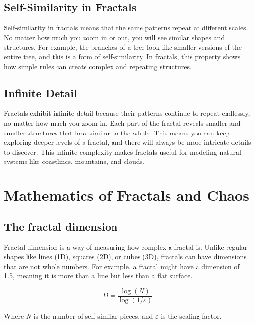 \documentclass[12pt]{article}
\begin{document}
\subsection{Self-Similarity in Fractals}
Self-similarity in fractals means that the same patterns repeat at different scales. No matter how much you zoom in or out, you will see similar shapes and structures. For example, the branches of a tree look like smaller versions of the entire tree, and this is a form of self-similarity. In fractals, this property shows how simple rules can create complex and repeating structures.

\subsection{Infinite Detail}
Fractals exhibit infinite detail because their patterns continue to repeat endlessly, no matter how much you zoom in. Each part of the fractal reveals smaller and smaller structures that look similar to the whole. This means you can keep exploring deeper levels of a fractal, and there will always be more intricate details to discover. This infinite complexity makes fractals useful for modeling natural systems like coastlines, mountains, and clouds.

\section{Mathematics of Fractals and Chaos}

\subsection{The fractal dimension}
Fractal dimension is a way of measuring how complex a fractal is. Unlike regular shapes like lines (1D), squares (2D), or cubes (3D), fractals can have dimensions that are not whole numbers. For example, a fractal might have a dimension of 1.5, meaning it is more than a line but less than a flat surface. 

\[
D = \frac{\log(N)}{\log(1/\varepsilon)}
\]

Where \( N \) is the number of self-similar pieces, and \( \varepsilon \) is the scaling factor.
\end{document}
